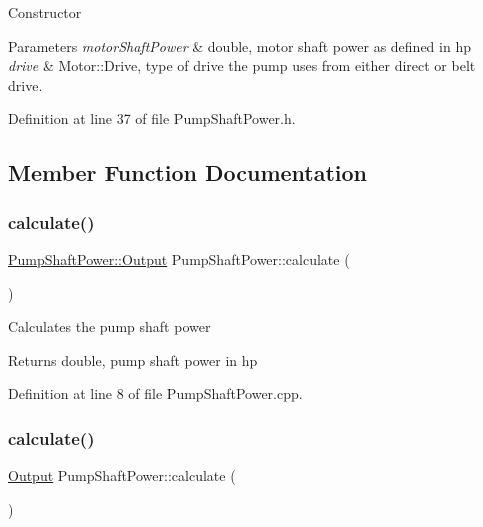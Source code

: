 Constructor 
\begin{DoxyParams}{Parameters}
{\em motor\+Shaft\+Power} & double, motor shaft power as defined in hp \\
\hline
{\em drive} & Motor\+::\+Drive, type of drive the pump uses from either direct or belt drive. \\
\hline
\end{DoxyParams}


Definition at line 37 of file Pump\+Shaft\+Power.\+h.



\subsection{Member Function Documentation}
\mbox{\label{class_pump_shaft_power_a0937a4e2e68682658a33ee4ea4ce00d8}} 
\subsubsection{\texorpdfstring{calculate()}{calculate()}\hspace{0.1cm}{\footnotesize\ttfamily [1/3]}}
{\footnotesize\ttfamily \hyperlink{struct_pump_shaft_power_1_1_output}{Pump\+Shaft\+Power\+::\+Output} Pump\+Shaft\+Power\+::calculate (\begin{DoxyParamCaption}{ }\end{DoxyParamCaption})}

Calculates the pump shaft power \begin{DoxyReturn}{Returns}
double, pump shaft power in hp 
\end{DoxyReturn}


Definition at line 8 of file Pump\+Shaft\+Power.\+cpp.

\mbox{\label{class_pump_shaft_power_a5398dac8dedd059b0eefdcfe8cdbda60}} 
\subsubsection{\texorpdfstring{calculate()}{calculate()}\hspace{0.1cm}{\footnotesize\ttfamily [2/3]}}
{\footnotesize\ttfamily \hyperlink{struct_pump_shaft_power_1_1_output}{Output} Pump\+Shaft\+Power\+::calculate (\begin{DoxyParamCaption}{ }\end{DoxyParamCaption})}

